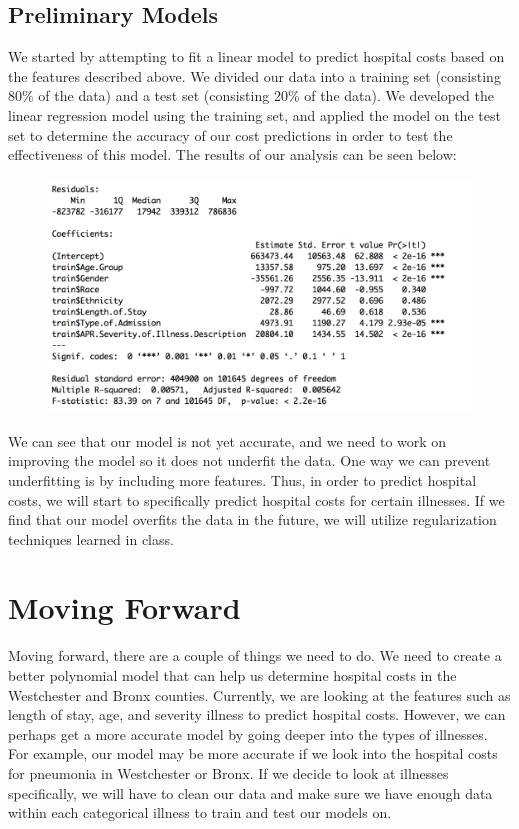 \documentclass{article}
\begin{document}
\subsection{Preliminary Models}

We started by attempting to fit a linear model to predict hospital costs based on the features described above. We divided our data into a training set (consisting 80\% of the data) and a test set (consisting 20\% of the data). We developed the linear regression model using the training set, and applied the model on the test set to determine the accuracy of our cost predictions in order to test the effectiveness of this model. The results of our analysis can be seen below:

\begin{figure}[h]
\centering
  \includegraphics[width=12cm]{results.png}
  \label{fig:boat1}
\end{figure}

We can see that our model is not yet accurate, and we need to work on improving the model so it does not underfit the data. One way we can prevent underfitting is by including more features. Thus, in order to predict hospital costs, we will start to specifically predict hospital costs for certain illnesses. If we find that our model overfits the data in the future, we will utilize regularization techniques learned in class. 

\section{Moving Forward}
Moving forward, there are a couple of things we need to do. We need to create a better polynomial model that can help us determine hospital costs in the Westchester and Bronx counties. Currently, we are looking at the features such as length of stay, age, and severity illness to predict hospital costs. However, we can perhaps get a more accurate model by going deeper into the types of illnesses. For example, our model may be more accurate if we look into the hospital costs for pneumonia in Westchester or Bronx. If we decide to look at illnesses specifically, we will have to clean our data and make sure we have enough data within each categorical illness to train and test our models on.  
\end{document}
